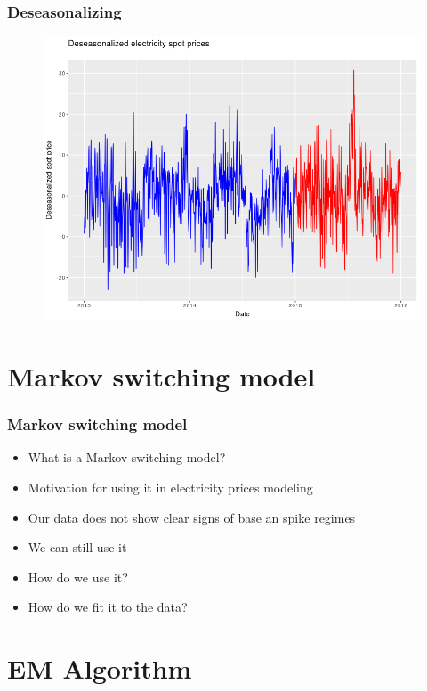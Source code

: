 \documentclass{beamer}
\begin{document}
\begin{frame}
\frametitle{Deseasonalizing}

\begin{figure}
\includegraphics[width=0.85\linewidth]{deseasonalized_data.png}
\end{figure}

\end{frame}

\section{Markov switching model}

\begin{frame}
\frametitle{Markov switching model}
\begin{itemize}
\item What is a Markov switching model?
\item Motivation for using it in electricity prices modeling
\item Our data does not show clear signs of base an spike regimes
\item We can still use it
\item How do we use it?
\item How do we fit it to the data?
\end{itemize}
\end{frame}

\section{EM Algorithm}
\end{document}
